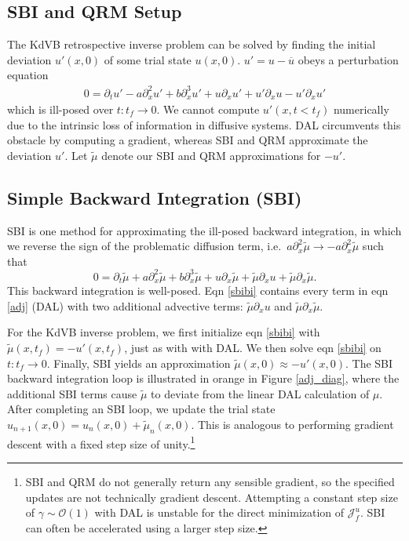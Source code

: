 \documentclass[%
 reprint,
 amsmath,amssymb,
 aps,
 pre,
]{revtex4-2}
\newcommand\tmu{\tilde{\mu}}
\newcommand{\Juf}{\mathcal{J}^{u}_f}
\begin{document}

\subsection{SBI and QRM Setup}\label{secsetup}
The KdVB retrospective inverse problem can be solved by finding the initial deviation $u'(x,0)$ of some trial state $u(x,0)$.
$u'=u - \overline{u}$ obeys a perturbation equation
\begin{align}
  0 = \partial_t u' - a\partial_x^2 u' + b\partial_x^3 u' + u\partial_x u' + u' \partial_x u - u'\partial_x u' \label{burgpert}
\end{align}
which is ill-posed over $t:t_f\to 0$.
We cannot compute $u'(x, t<t_f)$ numerically due to the intrinsic loss of information in diffusive systems.
DAL circumvents this obstacle by computing a gradient, whereas SBI and QRM approximate the deviation $u'$.
Let $\tmu$ denote our SBI and QRM approximations for $-u'$.

\subsection{Simple Backward Integration (SBI)}\label{secSBI}
SBI is one method for approximating the ill-posed backward integration, in which we reverse the sign of the problematic diffusion term, i.e.~$a\partial_x^2 \tmu \to -a\partial_x^2 \tmu$ such that
\begin{equation}
  0 = \partial_t \tmu + a\partial_x^2 \tmu + b\partial_x^3\tmu + u\partial_x\tmu + \tmu\partial_x u + \tmu\partial_x\tmu.\label{sbibi}
\end{equation} 
This backward integration is well-posed. 
Eqn \ref{sbibi} contains every term in eqn \ref{adj} (DAL) with two additional advective terms: $\tmu\partial_x u$ and $\tmu\partial_x\tmu$.

For the KdVB inverse problem, we first initialize eqn \ref{sbibi} with $\tmu(x, t_f) = -u'(x,t_f)$, just as with with DAL.
We then solve eqn \ref{sbibi} on $t:t_f\to 0$. 
Finally, SBI yields an approximation $\tmu(x,0)\approx-u'(x,0)$.
The SBI backward integration loop is illustrated in orange in Figure \ref{adj_diag}, where the additional SBI terms cause $\tmu$ to deviate from the linear DAL calculation of $\mu$.
After completing an SBI loop, we update the trial state $u_{n+1}(x,0) = u_n(x,0) + \tmu_n(x,0)$.
This is analogous to performing gradient descent with a fixed step size of unity.\footnote[3]{SBI and QRM do not generally return any sensible gradient, so the specified updates are not technically gradient descent. 
Attempting a constant step size of $\gamma\sim \mathcal{O}(1)$ with DAL is unstable for the direct minimization of $\Juf$. SBI can often be accelerated using a larger step size.}
\end{document}
